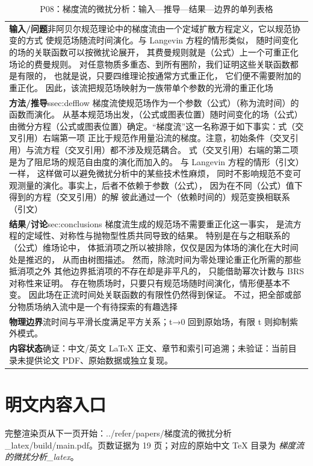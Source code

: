 \documentclass[UTF8,11pt,oneside]{ctexbook}
\begin{document}
\begin{table}[htbp]
  \centering
  \caption*{P08：梯度流的微扰分析：输入—推导—结果—边界的单列表格}
  \small
  \begin{tabular}{@{}p{}@{}}
    \toprule
    \textbf{输入/问题}\quad 非阿贝尔规范理论中的梯度流由一个定域扩散方程定义，它以规范协变的方式 使规范场随流时间演化。与 Langevin 方程的情形类似， 随时间变化的场的关联函数可以按微扰论展开， 其费曼规则就是（公式）上一个可重正化场论的费曼规则。 对任意物质多重态、到所有圈阶，我们证明这些关联函数都是有限的， 也就是说，只要四维理论按通常方式重正化， 它们便不需要附加的重正化。 因此，该流把规范场映射为一族带单个参数的光滑的重正化场 \\
    \textbf{方法/推导}\quad ssec:defflow 梯度流使规范场作为一个参数（公式）（称为流时间）的函数而演化。 从基本规范场出发，（公式或图表位置）随时间变化的场（公式）由微分方程（公式或图表位置）确定。``梯度流''这一名称源于如下事实：式（交叉引用）右端第一项 正比于规范作用量沿流的梯度。注意，初始条件（交叉引用）与流方程（交叉引用）都不涉及规范耦合。 式（交叉引用）右端的第二项是为了阻尼场的规范自由度的演化而加入的。 与 Langevin 方程的情形（引文）一样， 这样做可以避免微扰分析中的某些技术性麻烦， 同时不影响规范不变可观测量的演化。事实上，后者不依赖于参数（公式）， 因为在不同（公式）值下得到的方程（交叉引用）的解 彼此通过一个（依赖时间的）规范变换相联系（引文） \\
    \textbf{结果/讨论}\quad sec:conclusions 梯度流生成的规范场不需要重正化这一事实， 是流方程的定域性、对称性与抛物型性质共同导致的结果。 特别是在与之相联系的（公式）维场论中， 体抵消项之所以被排除，仅仅是因为体场的演化在大时间处是推迟的， 从而由树图描述。 然而，除流时间为零处理论重正化所需的那些抵消项之外 其他边界抵消项的不存在却是非平凡的， 只能借助幂次计数与 BRS 对称性来证明。 存在物质场时，只要只有规范场随时间演化，情形便基本不变。 因此场在正流时间处关联函数的有限性仍然得到保证。 不过，把全部或部分物质场纳入流中是一个有待探索的有趣选择 \\
    \textbf{物理边界}\quad 流时间与平滑长度满足平方关系；t→0 回到原始场，有限 t 则抑制紫外模式。 \\
    \textbf{内容状态}\quad 确证：中文/英文 LaTeX 正文、章节和索引可追溯；未验证：当前目录未提供论文 PDF、原始数据或独立复现。 \\
    \bottomrule
  \end{tabular}
\end{table}
\section*{明文内容入口}
\noindent 完整渲染页从下一页开始：../\allowbreak{}refer/\allowbreak{}papers/\allowbreak{}梯度流的微扰分析\_\allowbreak{}latex/\allowbreak{}build/\allowbreak{}main.pdf。页数证据为 19 页；对应的原始中文 TeX 目录为 \emph{梯度流的微扰分析\_latex}。
\clearpage

\clearpage
\end{document}
